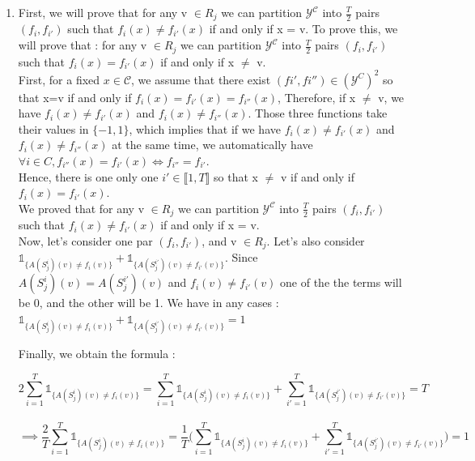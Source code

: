 \documentclass[final,3p,times,12pt]{article}
\begin{document}
\begin{enumerate}
\begin{enumerate}
\item 
First, we will prove that for any v $\in R_j$ we can partition $\mathcal{Y}^{\mathcal{C}}$ into $\frac{T}{2}$ pairs $(f_i, f_{i'})$ such that $f_i(x) \neq f_{i'}(x)$ if and only if x = v.  To prove this, we will prove that : for any v $\in R_j$ we can partition $\mathcal{Y}^{\mathcal{C}}$ into $\frac{T}{2}$ pairs $(f_i, f_{i'})$ such that $f_i(x) = f_{i'}(x)$ if and only if x $\neq$ v.\\

First, for a fixed $x \in \mathcal{C}$, we assume that there exist $(fi', fi'') \in (\mathcal{Y}^C)^2 $ so that x=v if and only if $f_i(x) = f_{i'}(x)=f_{i''}(x)$, Therefore, if x $\neq$ v, we have $f_i(x) \neq f_{i'}(x)$ and $f_i(x) \neq f_{i''}(x)$. Those three functions take their values in $\{-1,1\}$, which implies that if we have $f_i(x) \neq f_{i'}(x)$ and $f_i(x) \neq f_{i''}(x)$ at the same time, we automatically have $\forall i \in C, f_{i''}(x) = f_{i'}(x) \Leftrightarrow f_{i''} = f_{i'}$.\\

Hence, there is one only one $i' \in \llbracket 1,T \rrbracket $ so that x $\neq$ v if and only if $f_i(x) = f_{i'}(x)$. \\

We proved that for any v $\in R_j$ we can partition $\mathcal{Y}^{\mathcal{C}}$ into $\frac{T}{2}$ pairs $(f_i, f_{i'})$ such that $f_i(x) \neq f_{i'}(x)$ if and only if x = v.\\

Now, let's consider one par $(f_i, f_{i'})$, and v $\in R_j$. Let's also consider $\mathbb{1}_{\{A(S_j^i)(v) \neq f_i(v)\}} + \mathbb{1}_{\{A(S_j^{i'})(v) \neq f_{i'}(v)\}}$. Since $A(S_j^i)(v) = A(S_j^{i'})(v)$ and $f_i(v) \neq f_{i'}(v)$ one of the the terms will be 0, and the other will be 1. We have in any cases : $\mathbb{1}_{\{A(S_j^i)(v) \neq f_i(v)\}} + \mathbb{1}_{\{A(S_j^{i'})(v) \neq f_{i'}(v)\}} = 1$

Finally, we obtain the formula : 

\[
2 \sum_{i=1}^{T} \mathbb{1}_{\{A(S_j^i)(v) \neq f_i(v)\}} = \sum_{i=1}^{T} \mathbb{1}_{\{A(S_j^i)(v) \neq f_i(v)\}} + \sum_{i'=1}^{T}\mathbb{1}_{\{A(S_j^{i'})(v) \neq f_{i'}(v)\}} = T
\]\\

\[ \implies 
\frac{2}{T} \sum_{i=1}^{T} \mathbb{1}_{\{A(S_j^i)(v) \neq f_i(v)\}} = \frac{1}{T} \big( \sum_{i=1}^{T} \mathbb{1}_{\{A(S_j^i)(v) \neq f_i(v)\}} + \sum_{i'=1}^{T}\mathbb{1}_{\{A(S_j^{i'})(v) \neq f_{i'}(v)\}}\big) = 1
\]\\


\end{enumerate}
\end{enumerate}
\end{document}
